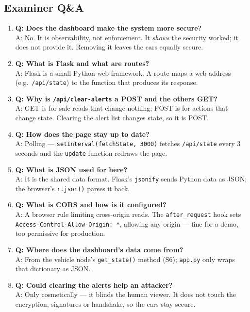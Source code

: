 \documentclass[11pt,a4paper]{article}
\begin{document}
\subsection{Examiner Q\&A}
\begin{enumerate}
  \item \textbf{Q: Does the dashboard make the system more secure?}\\
        A: No. It is observability, not enforcement. It \emph{shows} the security
        worked; it does not provide it. Removing it leaves the cars equally
        secure.
  \item \textbf{Q: What is Flask and what are routes?}\\
        A: Flask is a small Python web framework. A route maps a web address
        (e.g.\ \texttt{/api/state}) to the function that produces its response.
  \item \textbf{Q: Why is \texttt{/api/clear-alerts} a POST and the others GET?}\\
        A: GET is for safe reads that change nothing; POST is for actions that
        change state. Clearing the alert list changes state, so it is POST.
  \item \textbf{Q: How does the page stay up to date?}\\
        A: Polling --- \texttt{setInterval(fetchState, 3000)} fetches
        \texttt{/api/state} every 3 seconds and the \texttt{update} function
        redraws the page.
  \item \textbf{Q: What is JSON used for here?}\\
        A: It is the shared data format. Flask's \texttt{jsonify} sends Python
        data as JSON; the browser's \texttt{r.json()} parses it back.
  \item \textbf{Q: What is CORS and how is it configured?}\\
        A: A browser rule limiting cross-origin reads. The \texttt{after\_request}
        hook sets \texttt{Access-Control-Allow-Origin: *}, allowing any origin
        --- fine for a demo, too permissive for production.
  \item \textbf{Q: Where does the dashboard's data come from?}\\
        A: From the vehicle node's \texttt{get\_state()} method (S6);
        \texttt{app.py} only wraps that dictionary as JSON.
  \item \textbf{Q: Could clearing the alerts help an attacker?}\\
        A: Only cosmetically --- it blinds the human viewer. It does not touch
        the encryption, signatures or handshake, so the cars stay secure.
\end{enumerate}
\end{document}
